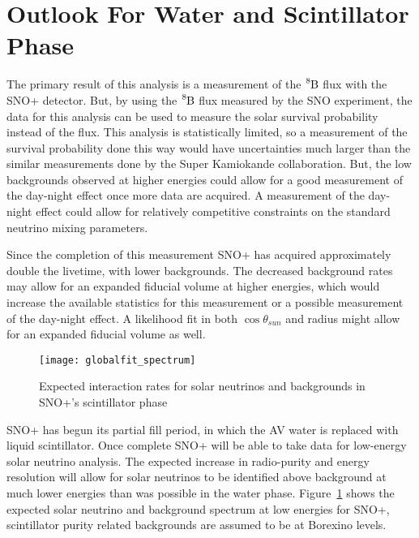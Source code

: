 \section{Outlook For Water and Scintillator Phase}
The primary result of this analysis is a measurement of the $\ce{^{8}B}$
flux with the SNO+ detector. 
But, by using the $\ce{^{8}B}$ flux measured by the SNO experiment, the data for
this analysis can be used to measure the solar survival probability instead
of the flux.
This analysis is statistically limited, so a measurement of the survival
probability done this way would have uncertainties much larger than the similar
measurements done by the Super Kamiokande collaboration.
But, the low backgrounds observed at higher energies could allow for a good measurement
of the day-night effect once more data are acquired.
A measurement of the day-night effect could allow for relatively
competitive constraints on the standard neutrino mixing parameters.

Since the completion of this measurement SNO+ has acquired approximately double
the livetime, with lower backgrounds.
The decreased background rates may allow for an expanded fiducial volume at
higher energies, which would increase the available statistics for this measurement
or a possible measurement of the day-night effect.
A likelihood fit in both $\cos\theta_{sun}$ and radius might allow for an
expanded fiducial volume as well.

\begin{figure}[htbp]
    \centering
    \texttt{[image: globalfit\_spectrum]}
    \caption[Expected Scintillator Phase SNO+ Solar Neutrino Spectrum]{Expected interaction
    rates for solar neutrinos and backgrounds in SNO+'s scintillator phase}
    \label{fig:snop_scintillator}
\end{figure}
SNO+ has begun its partial fill
period, in which the AV  water is replaced with liquid scintillator.
Once complete SNO+ will be able to take data for low-energy solar neutrino
analysis.
The expected increase in radio-purity and energy resolution will allow
for solar neutrinos to be identified above background at much lower energies
than was possible in the water phase.
Figure~\ref{fig:snop_scintillator} shows the expected solar neutrino and
background spectrum at low energies for SNO+, scintillator purity related
backgrounds are assumed to be at Borexino levels.

